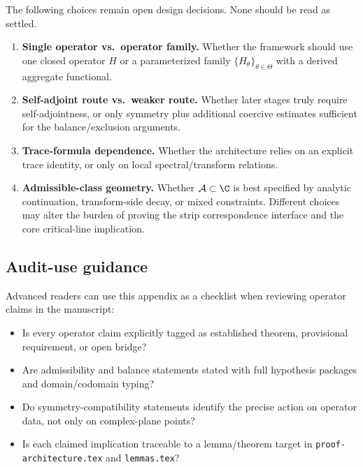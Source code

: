 The following choices remain open design decisions. None should be read as
settled.
\begin{enumerate}
  \item \textbf{Single operator vs.\ operator family.} Whether the framework
  should use one closed operator $H$ or a parameterized family
  $\{H_\theta\}_{\theta\in\Theta}$ with a derived aggregate functional.
  \item \textbf{Self-adjoint route vs.\ weaker route.} Whether later stages
  truly require self-adjointness, or only symmetry plus additional coercive
  estimates sufficient for the balance/exclusion arguments.
  \item \textbf{Trace-formula dependence.} Whether the architecture relies on an
  explicit trace identity, or only on local spectral/transform relations.
  \item \textbf{Admissible-class geometry.} Whether
  $\mathcal{A}\subset\C$ is best specified by analytic continuation,
  transform-side decay, or mixed constraints. Different choices may alter the
  burden of proving the strip correspondence interface and the core
  critical-line implication.
\end{enumerate}


\subsection{Audit-use guidance}

Advanced readers can use this appendix as a checklist when reviewing operator
claims in the manuscript:
\begin{itemize}
  \item Is every operator claim explicitly tagged as established theorem,
  provisional requirement, or open bridge?
  \item Are admissibility and balance statements stated with full hypothesis
  packages and domain/codomain typing?
  \item Do symmetry-compatibility statements identify the precise action on
  operator data, not only on complex-plane points?
  \item Is each claimed implication traceable to a lemma/theorem target in
  \texttt{proof-architecture.tex} and \texttt{lemmas.tex}?
\end{itemize}

